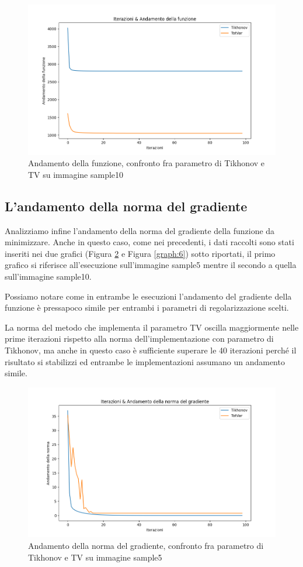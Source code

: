 \documentclass[12pt]{article}
\begin{document}
    \begin{figure}[h!]
    \centering
    \includegraphics[width=12cm]{fun-sample10}
    \caption{Andamento della funzione, confronto fra parametro di Tikhonov e TV su immagine sample10}
    \label{graph:4}
    \end{figure}

    \newpage
    \subsection{L'andamento della norma del gradiente}
    Analizziamo infine l'andamento della norma del gradiente della funzione da minimizzare. Anche in questo caso, come nei precedenti, i dati raccolti sono stati inseriti nei due grafici (Figura \ref{graph:5} e Figura \ref{graph:6}) sotto riportati, il primo grafico si riferisce all'esecuzione sull'immagine sample5 mentre il secondo a quella sull'immagine sample10.
    
    Possiamo notare come in entrambe le esecuzioni l'andamento del gradiente della funzione è pressapoco simile per entrambi i parametri di regolarizzazione scelti. 
    
    La norma del metodo che implementa il parametro TV oscilla maggiormente nelle prime iterazioni rispetto alla norma dell'implementazione con parametro di Tikhonov, ma anche in questo caso è sufficiente superare le 40 iterazioni perché il risultato si stabilizzi ed entrambe le implementazioni assumano un andamento simile.
    
    \begin{figure}[h!]
    \centering
    \includegraphics[width=12cm]{norma-sample5}
    \caption{Andamento della norma del gradiente, confronto fra parametro di Tikhonov e TV su immagine sample5}
    \label{graph:5}
    \end{figure}
    
\end{document}
